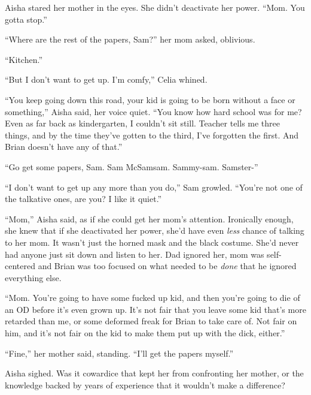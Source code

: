 Aisha stared her mother in the eyes.  She didn't deactivate her power.  ``Mom.  You gotta stop.''



``Where are the rest of the papers, Sam?'' her mom asked, oblivious.



``Kitchen.''



``But I don't want to get up.  I'm comfy,'' Celia whined.



``You keep going down this road, your kid is going to be born without a face or something,'' Aisha said, her voice quiet.  ``You know how hard school was for me?  Even as far back as kindergarten, I couldn't sit still.  Teacher tells me three things, and by the time they've gotten to the third, I've forgotten the first.  And Brian doesn't have any of that.''



``Go get some papers, Sam.  Sam McSamsam.  Sammy-sam.  Samster-''



``I don't want to get up any more than you do,'' Sam growled.  ``You're not one of the talkative ones, are you?  I like it quiet.''



``Mom,'' Aisha said, as if she could get her mom's attention.  Ironically enough, she knew that if she deactivated her power, she'd have even \emph{less} chance of talking to her mom.  It wasn't just the horned mask and the black costume.  She'd never had anyone just sit down and listen to her.  Dad ignored her, mom was self-centered and Brian was too focused on what needed to be \emph{done} that he ignored everything else.



``Mom.  You're going to have some fucked up kid, and then you're going to die of an OD before it's even grown up.  It's not fair that you leave some kid that's more retarded than me, or some deformed freak for Brian to take care of.  Not fair on him, and it's not fair on the kid to make them put up with the dick, either.''



``Fine,'' her mother said, standing.  ``I'll get the papers myself.''



Aisha sighed.  Was it cowardice that kept her from confronting her mother, or the knowledge backed by years of experience that it wouldn't make a difference?



